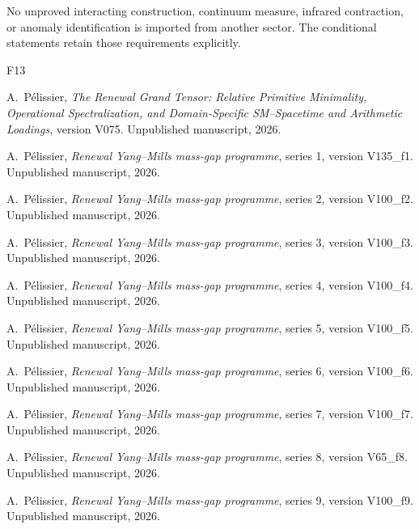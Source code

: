 \documentclass[11pt,oneside,openany]{book}
\theoremstyle{definition}
\theoremstyle{remark}
\begin{document}
No unproved interacting construction, continuum measure, infrared
contraction, or anomaly identification is imported from another sector.
The conditional statements retain those requirements explicitly.

\backmatter

\begin{thebibliography}{F13}


A.~P\'elissier, \emph{The Renewal Grand Tensor: Relative Primitive Minimality, Operational Spectralization, and Domain-Specific SM--Spacetime and Arithmetic Loadings}, version V075. Unpublished manuscript, 2026.


A.~P\'elissier, \emph{Renewal Yang--Mills mass-gap programme}, series 1, version V135\_f1. Unpublished manuscript, 2026.


A.~P\'elissier, \emph{Renewal Yang--Mills mass-gap programme}, series 2, version V100\_f2. Unpublished manuscript, 2026.


A.~P\'elissier, \emph{Renewal Yang--Mills mass-gap programme}, series 3, version V100\_f3. Unpublished manuscript, 2026.


A.~P\'elissier, \emph{Renewal Yang--Mills mass-gap programme}, series 4, version V100\_f4. Unpublished manuscript, 2026.


A.~P\'elissier, \emph{Renewal Yang--Mills mass-gap programme}, series 5, version V100\_f5. Unpublished manuscript, 2026.


A.~P\'elissier, \emph{Renewal Yang--Mills mass-gap programme}, series 6, version V100\_f6. Unpublished manuscript, 2026.


A.~P\'elissier, \emph{Renewal Yang--Mills mass-gap programme}, series 7, version V100\_f7. Unpublished manuscript, 2026.


A.~P\'elissier, \emph{Renewal Yang--Mills mass-gap programme}, series 8, version V65\_f8. Unpublished manuscript, 2026.


A.~P\'elissier, \emph{Renewal Yang--Mills mass-gap programme}, series 9, version V100\_f9. Unpublished manuscript, 2026.


\end{thebibliography}
\end{document}
